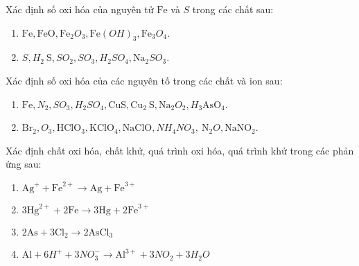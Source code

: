 \begin{bt}
	Xác định số oxi hóa của nguyên tử $\mathrm{Fe}$ và $S$ trong các chất sau:
	\begin{enumerate}
		\item $\mathrm{Fe}, \mathrm{FeO}, \mathrm{Fe}_2O_3, \mathrm{Fe}(OH)_3, \mathrm{Fe}_3O_4$.
		\item $S, H_2\mathrm{~S}, SO_2, SO_3, H_2SO_4, \mathrm{Na}_2SO_3$.
	\end{enumerate}
\end{bt}

\begin{bt}
	Xác định số oxi hóa của các nguyên tố trong các chất và ion sau:
	\begin{enumerate}
		\item $\mathrm{Fe}, N_2, SO_3, H_2SO_4, \mathrm{CuS}, \mathrm{Cu}_2\mathrm{~S}, \mathrm{Na}_2O_2, H_3\mathrm{AsO}_4$.
		\item $\mathrm{Br}_2, O_3, \mathrm{HClO}_3, \mathrm{KClO}_4, \mathrm{NaClO}, NH_4NO_3, \mathrm{~N}_2O, \mathrm{NaNO}_2$.
	\end{enumerate}
\end{bt}
\begin{bt}
	Xác định chất oxi hóa, chất khử, quá trình oxi hóa, quá trình khử trong các phản ứng sau:
	\begin{enumerate}
		\item $\mathrm{Ag}^{+}+\mathrm{Fe}^{2+} \to \mathrm{Ag}+\mathrm{Fe}^{3+}$
		\item $3\mathrm{Hg}^{2+}+2\mathrm{Fe} \to 3\mathrm{Hg}+2\mathrm{Fe}^{3+}$
		\item $2\mathrm{As}+3\mathrm{Cl}_2\to 2\mathrm{AsCl}_3$
		\item $\mathrm{Al}+6H^{+}+3NO_3^{-} \to \mathrm{Al}^{3+}+3NO_2+3H_2O$
	\end{enumerate}
	\loigiai{}
\end{bt}

